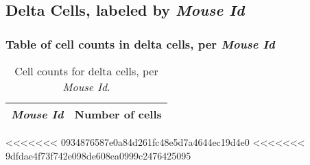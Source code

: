 \clearpage

\subsection{Delta Cells, labeled by \emph{Mouse Id}}
\subsubsection{Table of cell counts in delta cells, per \emph{Mouse Id}}\begin{table}[h]
\centering
\label{my-label}
\begin{tabular}{@{}ll@{}}
\toprule

\emph{Mouse Id}& Number of cells \\ \midrule\bottomrule
\end{tabular}
\caption{Cell counts for delta cells, per \emph{Mouse Id}.}
\end{table}

\clearpage
<<<<<<< 0934876587e0a84d261fc48e5d7a4644ec19d4e0
<<<<<<< 9dfdae4f73f742e098de608ea0999c2476425095
